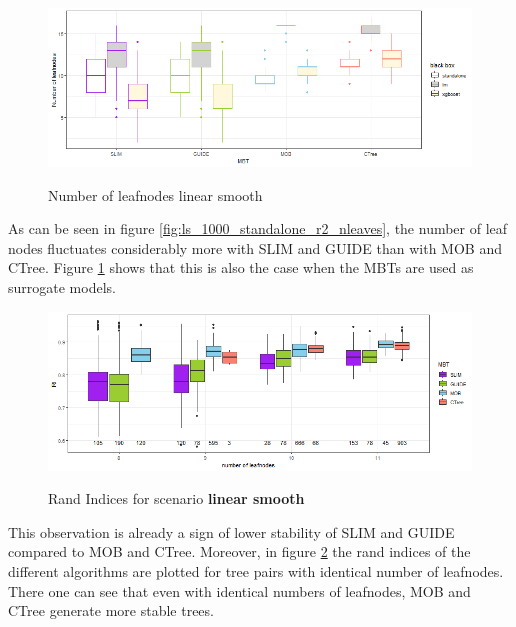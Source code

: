 \begin{figure}[!htb] 
\centering
    \includegraphics[width=14cm]{Figures/simulations/batchtools/basic_scenarios/linear_smooth/ls_1000_int.png}
    \label{fig:ls_1000_int}
    \caption{Number of leafnodes linear smooth}
\end{figure} 


As can be seen in figure \ref{fig:ls_1000_standalone_r2_nleaves}, the number of leaf nodes fluctuates considerably more with SLIM and GUIDE than with MOB and CTree. 
Figure \ref{fig:ls_1000_int} shows that this is also the case when the MBTs are used as surrogate models. 


\begin{figure}[!htb]
\centering
    \centering
    \includegraphics[width=14cm]{Figures/simulations/batchtools/basic_scenarios/linear_smooth/ls_1000_standalone_sta.png}
    \label{fig:ls_1000_standalone_sta}
    \caption{Rand Indices for scenario \textbf{linear smooth}}

\end{figure}

This observation is already a sign of lower stability of SLIM and GUIDE compared to MOB and CTree. Moreover, in figure \ref{fig:ls_1000_standalone_sta} the rand indices of the different algorithms are plotted for tree pairs with identical number of leafnodes. There one can see that even with identical numbers of leafnodes, MOB and CTree generate more stable trees.







